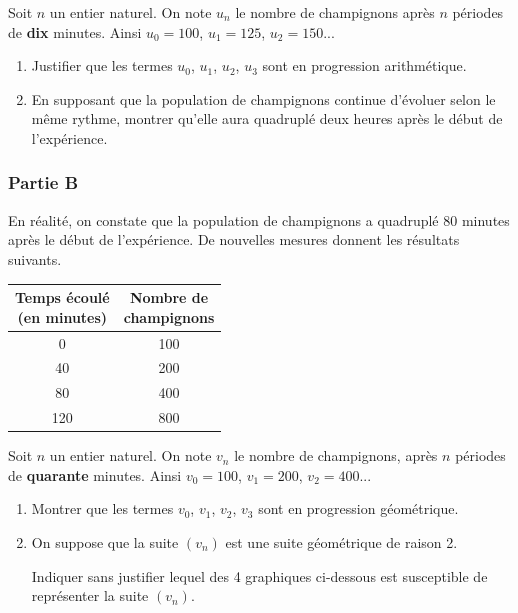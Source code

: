 \documentclass[10pt]{article}
\begin{document}
Soit $n$ un entier naturel. On note $u_n$ le nombre de champignons après $n$ périodes de \textbf{dix} minutes. Ainsi $u_0 = 100$, $u_1 = 125$, $u_2 = 150$...

\begin{enumerate}
\item Justifier que les termes $u_0$, $u_1$, $u_2$, $u_3$ sont en progression arithmétique.

\item En supposant que la population de champignons continue d'évoluer selon le même rythme, montrer qu'elle aura quadruplé deux heures après le début de l'expérience.
\end{enumerate}

\begin{minipage}[t]{0.6\textwidth}
\subsubsection*{Partie B}
En réalité, on constate que la population de champignons a quadruplé 80 minutes après le début de l'expérience. De nouvelles mesures donnent les résultats suivants.
\end{minipage}
\hfill
\begin{minipage}[t]{0.35\textwidth}
\vspace{0pt}
\begin{center}
\begin{tabular}{|c|c|}
\hline
\makecell{Temps écoulé \\ (en minutes)} & \makecell{Nombre de \\ champignons} \\
\hline
0 & 100 \\
40 & 200 \\
80 & 400 \\
120 & 800 \\
\hline
\end{tabular}
\end{center}
\end{minipage}

Soit $n$ un entier naturel. On note $v_n$ le nombre de champignons, après $n$ périodes de \textbf{quarante} minutes. Ainsi $v_0 = 100$, $v_1 = 200$, $v_2 = 400$...

\begin{enumerate}
\item Montrer que les termes $v_0$, $v_1$, $v_2$, $v_3$ sont en progression géométrique.

\item On suppose que la suite $(v_n)$ est une suite géométrique de raison 2.

Indiquer sans justifier lequel des 4 graphiques ci-dessous est susceptible de représenter la suite $(v_n)$.
\end{enumerate}
\end{document}
